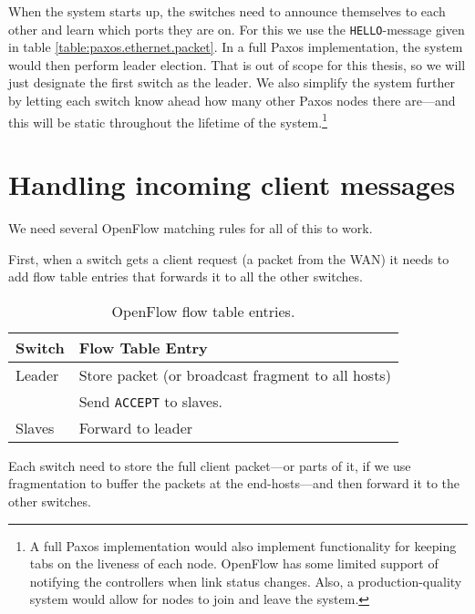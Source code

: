 When the system starts up, the switches need to announce themselves to each
other and learn which ports they are on.  For this we use the
\texttt{HELLO}-message given in table \ref{table:paxos.ethernet.packet}.
In a full Paxos implementation, the system would then perform leader
election.  That is out of scope for this thesis, so we will just designate
the first switch as the leader.  We also simplify the system further by
letting each switch know ahead how many other Paxos nodes there are---and
this will be static throughout the lifetime of the system.\footnote{A full
Paxos implementation would also implement functionality for keeping tabs
on the liveness of each node.  OpenFlow has some limited support of
notifying the controllers when link status changes.  Also, a
production-quality system would allow for nodes to join and leave the
system.}

\section{Handling incoming client messages}
\label{chapter:incoming.client}

We need several OpenFlow matching rules for all of this to work.

First, when a switch gets a client request (a packet from the WAN) it needs
to add flow table entries that forwards it to all the other switches.

\begin{table}[H]
  \centering
  \begin{tabular}{|l|l|}
    \hline
      \textbf{Switch} &
      \textbf{Flow Table Entry} \\

    \hline
      Leader & Store packet (or broadcast fragment to all hosts) \\
             & Send \texttt{ACCEPT} to slaves. \\

    \hline
      Slaves & Forward to leader \\

    \hline
  \end{tabular}

  \caption{OpenFlow flow table entries.}
  \label{table:paxos.flowtable.entries}
\end{table}

Each switch need to store the full client packet---or parts of it, if we
use fragmentation to buffer the packets at the end-hosts---and then forward
it to the other switches.

